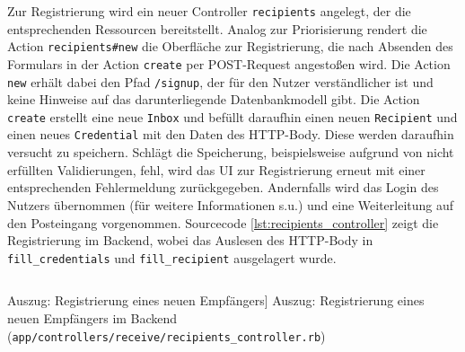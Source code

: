 Zur Registrierung wird ein neuer Controller \texttt{recipients} angelegt, der die entsprechenden Ressourcen bereitstellt. Analog zur Priorisierung rendert die Action \texttt{recipients\#new} die Oberfläche zur Registrierung, die nach Absenden des Formulars in der Action \texttt{create} per POST-Request angestoßen wird. Die Action \texttt{new} erhält dabei den Pfad \texttt{/signup}, der für den Nutzer verständlicher ist und keine Hinweise auf das darunterliegende Datenbankmodell gibt. Die Action \texttt{create} erstellt eine neue \texttt{Inbox} und befüllt daraufhin einen neuen \texttt{Recipient} und einen neues \texttt{Credential} mit den Daten des HTTP-Body. Diese werden daraufhin versucht zu speichern. Schlägt die Speicherung, beispielsweise aufgrund von nicht erfüllten Validierungen, fehl, wird das UI zur Registrierung erneut mit einer entsprechenden Fehlermeldung zurückgegeben. Andernfalls wird das Login des Nutzers übernommen (für weitere Informationen s.u.) und eine Weiterleitung auf den Posteingang vorgenommen. Sourcecode \ref{lst:recipients_controller} zeigt die Registrierung im Backend, wobei das Auslesen des HTTP-Body in \texttt{fill\_credentials} und \texttt{fill\_recipient} ausgelagert wurde.

\begin{listing}[!ht]
\inputminted[firstline=9, lastline=23, linenos]{ruby}{Listings/Pkg3/recipients_controller.rb}

\caption
    [Auszug: Registrierung eines neuen Empfängers]
    {Auszug: Registrierung eines neuen Empfängers im Backend (\texttt{app/controllers/receive/recipients\_controller.rb})}

\label{lst:recipients_controller}
\end{listing}

